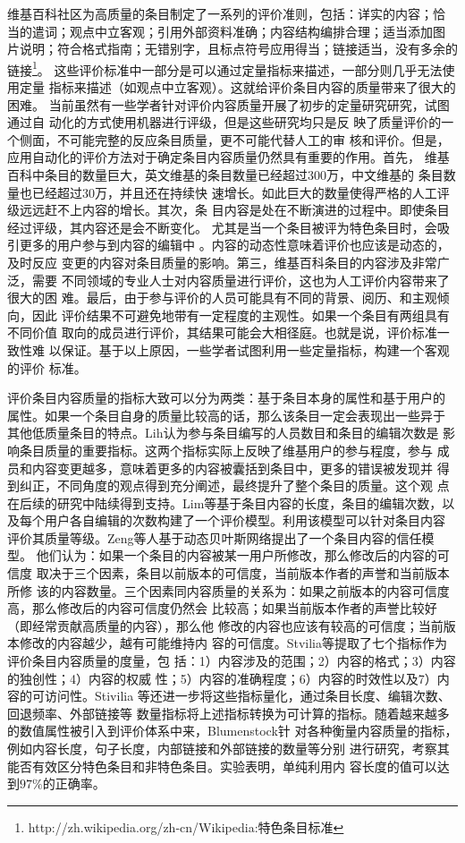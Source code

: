 维基百科社区为高质量的条目制定了一系列的评价准则，包括：详实的内容；恰
当的遣词；观点中立客观；引用外部资料准确；内容结构编排合理；适当添加图
片说明；符合格式指南；无错别字，且标点符号应用得当；链接适当，没有多余的链接\footnote{http://zh.wikipedia.org/zh-cn/Wikipedia:特色条目标准}。
这些评价标准中一部分是可以通过定量指标来描述，一部分则几乎无法使用定量
指标来描述（如观点中立客观）。这就给评价条目内容的质量带来了很大的困难。
当前虽然有一些学者针对评价内容质量开展了初步的定量研究研究，试图通过自
动化的方式使用机器进行评级，但是这些研究均只是反
映了质量评价的一个侧面，不可能完整的反应条目质量，更不可能代替人工的审
核和评价。但是，应用自动化的评价方法对于确定条目内容质量仍然具有重要的作用。首先，
维基百科中条目的数量巨大，英文维基的条目数量已经超过300万，中文维基的
条目数量也已经超过30万，并且还在持续快
速增长。如此巨大的数量使得严格的人工评级远远赶不上内容的增长。其次，条
目内容是处在不断演进的过程中。即使条目经过评级，其内容还是会不断变化。
尤其是当一个条目被评为特色条目时，会吸引更多的用户参与到内容的编辑中
\cite{1641333}。内容的动态性意味着评价也应该是动态的，及时反应
变更的内容对条目质量的影响。第三，维基百科条目的内容涉及非常广泛，需要
不同领域的专业人士对内容质量进行评价，这也为人工评价内容带来了很大的困
难。最后，由于参与评价的人员可能具有不同的背景、阅历、和主观倾向，因此
评价结果不可避免地带有一定程度的主观性。如果一个条目有两组具有不同价值
取向的成员进行评价，其结果可能会大相径庭。也就是说，评价标准一致性难
以保证。基于以上原因，一些学者试图利用一些定量指标，构建一个客观的评价
标准。

评价条目内容质量的指标大致可以分为两类：基于条目本身的属性和基于用户的
属性。如果一个条目自身的质量比较高的话，那么该条目一定会表现出一些异于
其他低质量条目的特点。Lih认为参与条目编写的人员数目和条目的编辑次数是
影响条目质量的重要指标\cite{Lih04wikipediaas}。这两个指标实际上反映了维基用户的参与程度，参与
成员和内容变更越多，意味着更多的内容被囊括到条目中，更多的错误被发现并
得到纠正，不同角度的观点得到充分阐述，最终提升了整个条目的质量。这个观
点在后续的研究中陆续得到支持。Lim等基于条目内容的长度，条目的编辑次数，以
及每个用户各自编辑的次数构建了一个评价模型。利用该模型可以针对条目内容
评价其质量等级\cite{1249051}。Zeng等人基于动态贝叶斯网络提出了一个条目内容的信任模型\cite{1501445}。
他们认为：如果一个条目的内容被某一用户所修改，那么修改后的内容的可信度
取决于三个因素，条目以前版本的可信度，当前版本作者的声誉和当前版本所修
该的内容数量。三个因素同内容质量的关系为：如果之前版本的内容可信度高，那么修改后的内容可信度仍然会
比较高；如果当前版本作者的声誉比较好（即经常贡献高质量的内容），那么他
修改的内容也应该有较高的可信度；当前版本修改的内容越少，越有可能维持内
容的可信度。Stvilia等提取了七个指标作为评价条目内容质量的度量，包
括：1）内容涉及的范围；2）内容的格式；3）内容的独创性；4）内容的权威
性；5）内容的准确程度；6）内容的时效性以及7）内容的可访问性\cite{stvilia2005assessing}。Stivilia
等还进一步将这些指标量化，通过条目长度、编辑次数、回退频率、外部链接等
数量指标将上述指标转换为可计算的指标。随着越来越多的数值属性被引入到评价体系中来，Blumenstock针
对各种衡量内容质量的指标，例如内容长度，句子长度，内部链接和外部链接的数量等分别
进行研究，考察其能否有效区分特色条目和非特色条目。实验表明，单纯利用内
容长度的值可以达到$97\%$的正确率\cite{1367673}。

